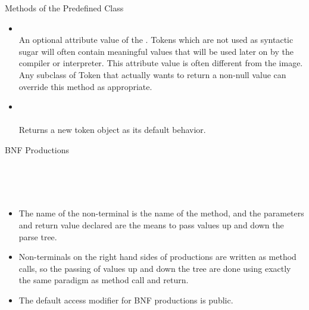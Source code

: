 \begin{bibunit}[apalike]
\begin{frame}{Methods of the Predefined  Class}
	\begin{itemize}
	\item {} \\
		An optional attribute value of the . Tokens which are not used as syntactic sugar will often contain meaningful values that will be used later on by the compiler or interpreter. This attribute value is often different from the image. Any subclass of Token that actually wants to return a non-null value can override this method as appropriate.
	\vfill
	\item {} \\
		 \\
		Returns a new token object as its default behavior.
	\end{itemize}
\end{frame}

\begin{frame}[t]{BNF Productions}
	\begin{definition}\small
		 \\
		 \\
		 \\
	\end{definition}
	\begin{itemize}
	\item The name of the non-terminal is the name of the method, and the parameters and return value declared are the means to pass values up and down the parse tree.
	\item Non-terminals on the right hand sides of productions are written as method calls, so the passing of values up and down the tree are done using exactly the same paradigm as method call and return.
	\item The default access modifier for BNF productions is public.
	\end{itemize}
\end{frame}


\end{bibunit}
